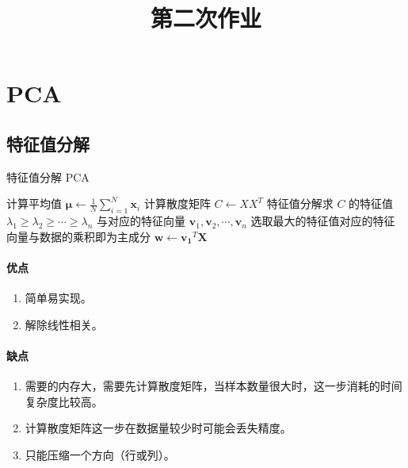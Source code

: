 
    \title{第二次作业}
    \maketitle

    \section{PCA}

    \subsection{特征值分解}

    \begin{algorithm}
        \caption{特征值分解 PCA}
        \BlankLine
        计算平均值 $\mathbf{\mu}\leftarrow\frac{1}{N}\sum_{i=1}^N \mathbf{x}_i$\;
        计算散度矩阵 $C\leftarrow XX^T$\;
        特征值分解求 $C$ 的特征值 $\lambda_1\geq\lambda_2\geq\cdots\geq\lambda_n$ 与对应的特征向量 $\mathbf{v}_1,\mathbf{v}_2,\cdots,\mathbf{v}_n$\;
        选取最大的特征值对应的特征向量与数据的乘积即为主成分 $\mathbf{w}\leftarrow\mathbf{v_1}^T\mathbf{X}$\;
        \;
    \end{algorithm}

    \paragraph{优点}
    
    \begin{enumerate}
        \item 简单易实现。
        \item 解除线性相关。
    \end{enumerate}
    
    \paragraph{缺点} 
    
    \begin{enumerate}
        \item 需要的内存大，需要先计算散度矩阵，当样本数量很大时，这一步消耗的时间复杂度比较高。
        \item 计算散度矩阵这一步在数据量较少时可能会丢失精度。
        \item 只能压缩一个方向（行或列）。
    \end{enumerate}

